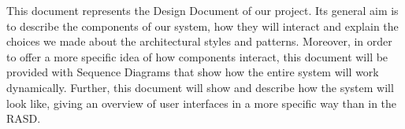 This document represents the Design Document of our project. Its general aim is to describe the components of our system, how they will interact and explain the choices we made about the architectural styles and patterns. 
\newline
Moreover, in order to offer a more specific idea of how components interact, this document will be provided with Sequence Diagrams that show how the entire system will work dynamically.
\newline
Further, this document will show and describe how the system will look like, giving an overview of user interfaces in a more specific way than in the RASD.